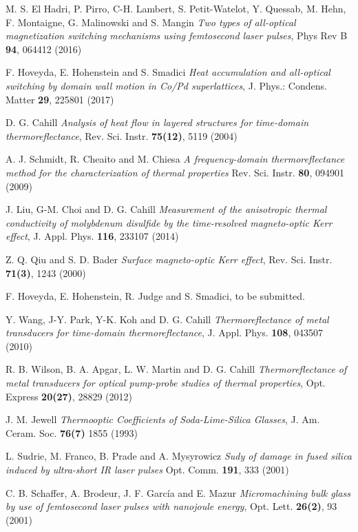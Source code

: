 \documentclass[5p]{elsarticle}
\begin{document}
\begin{thebibliography}{}
M. S. El Hadri, P. Pirro, C-H. Lambert, S. Petit-Watelot, Y. Quessab, M. Hehn, F. Montaigne, G. Malinowski and S. Mangin \emph{Two types of all-optical magnetization switching mechanisms using femtosecond laser pulses}, Phys Rev B \textbf{94}, 064412 (2016)

F. Hoveyda, E. Hohenstein and S. Smadici \emph{Heat accumulation and all-optical switching by domain wall motion in Co/Pd superlattices}, J. Phys.: Condens. Matter \textbf{29}, 225801 (2017)

D. G. Cahill \emph{Analysis of heat flow in layered structures for time-domain thermoreflectance}, Rev. Sci. Instr. \textbf{75(12)}, 5119 (2004)

A. J. Schmidt, R. Cheaito and M. Chiesa \emph{A frequency-domain thermoreflectance method for the characterization of thermal properties} Rev. Sci. Instr. \textbf{80}, 094901 (2009)

J. Liu, G-M. Choi and D. G. Cahill \emph{Measurement of the anisotropic thermal conductivity of molybdenum disulfide by the time-resolved magneto-optic Kerr effect}, J. Appl. Phys. \textbf{116}, 233107 (2014)

Z. Q. Qiu and S. D. Bader \emph{Surface magneto-optic Kerr effect}, Rev. Sci. Instr. \textbf{71(3)}, 1243 (2000)

F. Hoveyda, E. Hohenstein, R. Judge and S. Smadici, to be submitted.

Y. Wang, J-Y. Park, Y-K. Koh and D. G. Cahill \emph{Thermoreflectance of metal transducers for time-domain thermoreflectance}, J. Appl. Phys. \textbf{108}, 043507 (2010)

R. B. Wilson, B. A. Apgar, L. W. Martin and D. G. Cahill \emph{Thermoreflectance of metal transducers for optical pump-probe studies of thermal properties}, Opt. Express \textbf{20(27)}, 28829 (2012)

J. M. Jewell \emph{Thermooptic Coefficients of Soda-Lime-Silica Glasses}, J. Am. Ceram. Soc. \textbf{76(7)} 1855 (1993)

L. Sudrie, M. Franco, B. Prade and A. Mysyrowicz \emph{Sudy of damage in fused silica induced by ultra-short IR laser pulses} Opt. Comm. \textbf{191}, 333 (2001)

C. B. Schaffer, A. Brodeur, J. F. García and E. Mazur \emph{Micromachining bulk glass by use of femtosecond laser pulses with nanojoule energy}, Opt. Lett. \textbf{26(2)}, 93 (2001)


\end{thebibliography}
\end{document}

